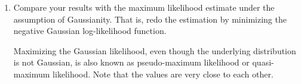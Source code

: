 \begin{enumerate}
          \begin{solution}~
          \end{solution}

    \item Compare your results with the maximum likelihood estimate under the assumption of Gaussianity. That is, redo the estimation by minimizing the negative Gaussian log-likelihood function.

          \begin{solution}
              Maximizing the Gaussian likelihood, even though the underlying distribution is not Gaussian, is also known as pseudo-maximum likelihood or quasi-maximum likelihood. Note that the values are very close to each other.
          \end{solution}
\end{enumerate}



